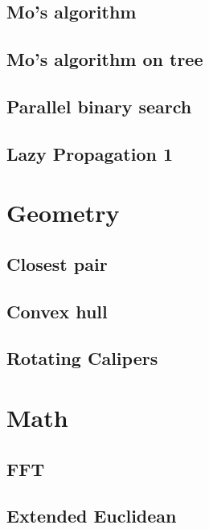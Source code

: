 \documentclass[10pt,landscape,a4paper,twocolumn]{article}
\begin{document}
\subsection{Mo's algorithm}


\subsection{Mo's algorithm on tree}


\subsection{Parallel binary search}


\subsection{Lazy Propagation 1}


\section{Geometry}
\subsection{Closest pair}


\subsection{Convex hull}


\subsection{Rotating Calipers}


\section{Math}
\subsection{FFT}


\subsection{Extended Euclidean}

\end{document}
